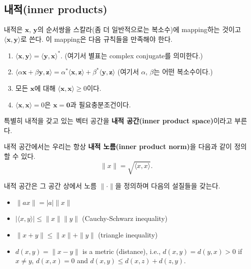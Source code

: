 \documentclass[b5paper,]{scrbook}
\theoremstyle{plain}
\theoremstyle{definition}
\numberwithin{equation}{section}
\let\BeginKnitrBlock\begin \let\EndKnitrBlock\end
\begin{document}
\hypertarget{inner-products}{%
\subsection{내적(inner products)}\label{inner-products}}

\BeginKnitrBlock{definition}[내적]
\protect\hypertarget{def:unnamed-chunk-19}{}{\label{def:unnamed-chunk-19} {} }내적은 \(\mathbf{x}\), \(\mathbf{y}\)의 순서쌍을 스칼라(좀 더 일반적으로는 복소수)에 mapping하는 것이고 \(\langle\mathbf{x},\mathbf{y}\rangle\)로 쓴다. 이 mapping은 다음 규칙들을 만족해야 한다.

\begin{enumerate}
\def\labelenumi{\arabic{enumi}.}
\item
  \(\langle\mathbf{x},\mathbf{y}\rangle = \langle\mathbf{y},\mathbf{x}\rangle^{*}\). (여기서 별표는 complex conjugate를 의미한다.)
\item
  \(\langle\alpha\mathbf{x}+\beta\mathbf{y}, \mathbf{z}\rangle = \alpha^{*}\langle\mathbf{x},\mathbf{z}\rangle+\beta^{*}\langle\mathbf{y},\mathbf{z}\rangle\) (여기서 \(\alpha\), \(\beta\)는 어떤 복소수이다.)
\item
  모든 \(\mathbf{x}\)에 대해 \(\langle\mathbf{x},\mathbf{x}\rangle \geq 0\)이다.
\item
  \(\langle\mathbf{x},\mathbf{x}\rangle = 0\)은 \(\mathbf{x}=\mathbf{0}\)과 필요충분조건이다.
\end{enumerate}
\EndKnitrBlock{definition}

특별히 내적을 갖고 있는 벡터 공간을 \textbf{내적 공간(inner product space)}이라고 부른다.

내적 공간에서는 우리는 항상 \textbf{내적 노름(inner product norm)}을 다음과 같이 정의할 수 있다.
\[\|x\|=\sqrt{\langle x,x\rangle}.\]

\BeginKnitrBlock{proposition}[내적 공간의 노름과 관련된 성질들]
\protect\hypertarget{prp:unnamed-chunk-20}{}{\label{prp:unnamed-chunk-20} {} }내적 공간은 그 공간 상에서 노름 \(\| \cdot \|\)을 정의하며 다음의 설질들을 갖는다.

\begin{itemize}
\item
  \(\|ax\|=|a|\|x\|\)
\item
  \(|\langle x,y\rangle | \leq \|x\| \|y\|\) (Cauchy-Schwarz inequality)
\item
  \(\|x+y\| \leq \|x\| +\|y\|\) (triangle inequality)
\item
  \(d(x,y) = \|x-y\|\) is a metric (distance), i.e., \(d(x,y)=d(y,x)>0\) if \(x\neq y\), \(d(x,x)=0\) and \(d(x,y) \leq d(x,z) + d(z,y)\).
\end{itemize}
\EndKnitrBlock{proposition}
\end{document}
